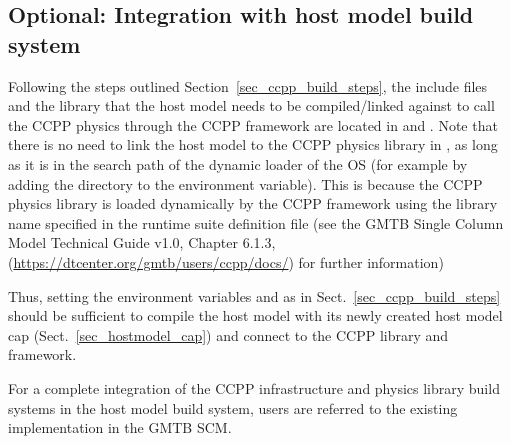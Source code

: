 \subsection{Optional: Integration with host model build system}
Following the steps outlined Section~\ref{sec_ccpp_build_steps}, the include files and the library  that the host model needs to be compiled/linked against to call the CCPP physics through the CCPP framework are located in  and . Note that there is no need to link the host model to the CCPP physics library in , as long as it is in the search path of the dynamic loader of the OS (for example by adding the directory  to the  environment variable). This is because the CCPP physics library is loaded dynamically by the CCPP framework using the library name specified in the runtime suite definition file (see the GMTB Single Column Model Technical Guide v1.0, Chapter 6.1.3, (\url{https://dtcenter.org/gmtb/users/ccpp/docs/}) for further information)

Thus, setting the environment variables  and  as in Sect.~\ref{sec_ccpp_build_steps} should be sufficient to compile the host model with its newly created host model cap (Sect.~\ref{sec_hostmodel_cap}) and connect to the CCPP library and framework.

For a complete integration of the CCPP infrastructure and physics library build systems in the host model build system, users are referred to the existing implementation in the GMTB SCM.